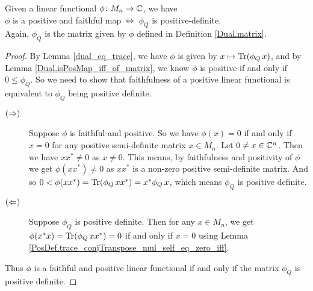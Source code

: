  \begin{proposition}\label{Dual.isFaithfulPosMap_iff}
    \leanok
    Given a linear functional $\phi\colon{M_n}\to\mathbb{C}$, we have\\
    \hspace*{0.5cm}$\phi$ is a positive and faithful map $\,\Leftrightarrow\,$ $\phi_Q$ is positive-definite.\\
    Again, $\phi_Q$ is the matrix given by $\phi$ defined in Definition \ref{Dual.matrix}.
   \end{proposition}
   \begin{proof}\leanok
    By Lemma \ref{dual_eq_trace}, we have $\phi$ is given by $x\mapsto\operatorname{Tr}(\phi_Q\, x)$, and by Lemma \ref{Dual.isPosMap_iff_of_matrix}, we know $\phi$ is positive if and only if $0\leq\phi_Q$.
    So we need to show that faithfulness of a positive linear functional is equivalent to $\phi_Q$ being positive definite.
    \begin{description}
     \item[$(\Rightarrow)$]
      Suppose $\phi$ is faithful and positive.
      So we have $\phi(x)=0$ if and only if $x=0$ for any positive semi-definite matrix $x\in{M_n}$.
      Let $0\neq{x}\in\mathbb{C}^n$. Then we have $xx^*\neq0$ as $x\neq0$. This means, by faithfulness and positivity of $\phi$ we get $\phi(xx^*)\neq0$ as $xx^*$ is a non-zero positive semi-definite matrix. And so $0<\phi(xx^*)=\operatorname{Tr}(\phi_Q\, xx^*)=x^*\phi_Q\, x$, which means $\phi_Q$ is positive definite.
     \item[$(\Leftarrow)$]
      Suppose $\phi_Q$ is positive definite. Then for any $x\in{M_n}$, we get $\phi(x^*x)=\operatorname{Tr}(\phi_Q\, xx^*)=0$ if and only if $x=0$ using Lemma \ref{PosDef.trace_conjTranspose_mul_self_eq_zero_iff}.
    \end{description}
    Thus $\phi$ is a faithful and positive linear functional if and only if the matrix $\phi_Q$ is positive definite.
   \end{proof}


